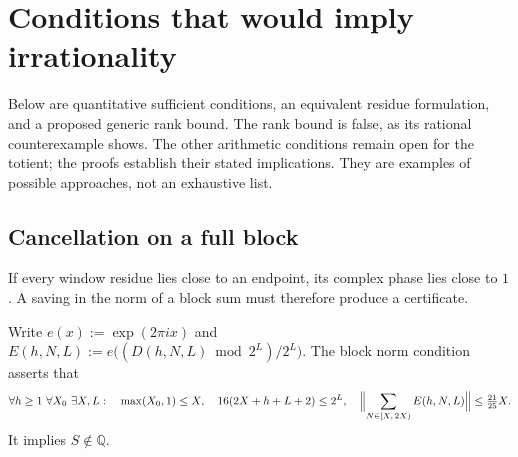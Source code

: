 \section{Conditions that would imply irrationality}
\label{sec:survivors}

Below are quantitative sufficient conditions, an equivalent
residue formulation, and a proposed generic rank bound. The rank bound
is false, as its rational counterexample shows. The other arithmetic
conditions remain open for the totient; the proofs establish their
stated implications. They are examples of possible approaches, not
an exhaustive list.

\subsection{Cancellation on a full block}

If every window residue lies close to an endpoint, its complex phase
lies close to $1$. A saving in the norm of a block sum must therefore
produce a certificate.

\begin{defn}
\label{defn:fh}
Write $e(x) := \exp(2\pi i x)$ and
${E}(h,N,L) := e\bigl(({D}(h,N,L) \bmod 2^{L})/2^{L}\bigr)$.
The block norm condition asserts that
\[
  \forall h \ge 1\ \forall X_0\ \exists X, L : \quad
  \max(X_0,1) \le X, \quad
  16(2X + h + L + 2) \le 2^{L}, \quad
  \Bigl\lVert \sum_{N \in [X,\,2X)} {E}(h,N,L) \Bigr\rVert
  \le \tfrac{21}{25}X .
\]
It implies $S\notin\mathbb Q$.
\end{defn}

